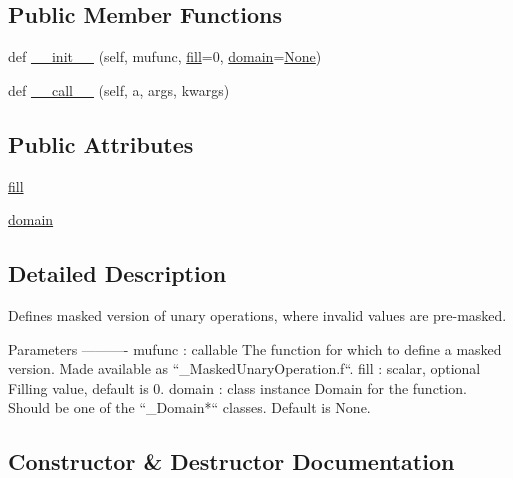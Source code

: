 \subsection*{Public Member Functions}
\begin{DoxyCompactItemize}
\item 
def \hyperlink{classnumpy_1_1ma_1_1core_1_1__MaskedUnaryOperation_ad8514e1fbe17c99fc309a39edd50e7d7}{\+\_\+\+\_\+init\+\_\+\+\_\+} (self, mufunc, \hyperlink{classnumpy_1_1ma_1_1core_1_1__MaskedUnaryOperation_ac012762e64952e236417eb8df65a99c1}{fill}=0, \hyperlink{classnumpy_1_1ma_1_1core_1_1__MaskedUnaryOperation_ac7658b1de49c8fc1297e30385f79f81c}{domain}=\hyperlink{namespacenumpy_1_1ma_1_1core_a647ee1848dfa3692fe35a663a2aa40b3}{None})
\item 
def \hyperlink{classnumpy_1_1ma_1_1core_1_1__MaskedUnaryOperation_a5706aedbf16c47c439cf4869448e419b}{\+\_\+\+\_\+call\+\_\+\+\_\+} (self, a, args, kwargs)
\end{DoxyCompactItemize}
\subsection*{Public Attributes}
\begin{DoxyCompactItemize}
\item 
\hyperlink{classnumpy_1_1ma_1_1core_1_1__MaskedUnaryOperation_ac012762e64952e236417eb8df65a99c1}{fill}
\item 
\hyperlink{classnumpy_1_1ma_1_1core_1_1__MaskedUnaryOperation_ac7658b1de49c8fc1297e30385f79f81c}{domain}
\end{DoxyCompactItemize}


\subsection{Detailed Description}
\begin{DoxyVerb}Defines masked version of unary operations, where invalid values are
pre-masked.

Parameters
----------
mufunc : callable
    The function for which to define a masked version. Made available
    as ``_MaskedUnaryOperation.f``.
fill : scalar, optional
    Filling value, default is 0.
domain : class instance
    Domain for the function. Should be one of the ``_Domain*``
    classes. Default is None.\end{DoxyVerb}
 

\subsection{Constructor \& Destructor Documentation}
\mbox{\label{classnumpy_1_1ma_1_1core_1_1__MaskedUnaryOperation_ad8514e1fbe17c99fc309a39edd50e7d7}} 
